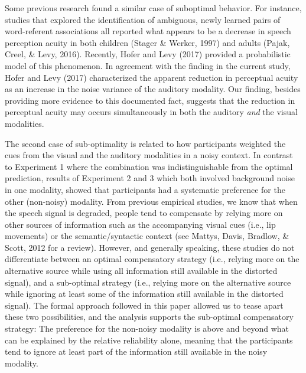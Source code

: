 \documentclass[english,floatsintext,man]{apa6}
\theoremstyle{definition}
\theoremstyle{definition}
\theoremstyle{definition}
\theoremstyle{remark}
\begin{document}
Some previous research found a similar case of suboptimal behavior. For
instance, studies that explored the identification of ambiguous, newly
learned pairs of word-referent associations all reported what appears to
be a decrease in speech perception acuity in both children (Stager \&
Werker, 1997) and adults (Pajak, Creel, \& Levy, 2016). Recently, Hofer
and Levy (2017) provided a probabilistic model of this phenomenon. In
agreement with the finding in the current study, Hofer and Levy (2017)
characterized the apparent reduction in perceptual acuity as an increase
in the noise variance of the auditory modality. Our finding, besides
providing more evidence to this documented fact, suggests that the
reduction in perceptual acuity may occurs simultaneously in both the
auditory \emph{and} the visual modalities.

The second case of sub-optimality is related to how participants
weighted the cues from the visual and the auditory modalities in a noisy
context. In contrast to Experiment 1 where the combination was
indistinguishable from the optimal prediction, results of Experiment 2
and 3 which both involved background noise in one modality, showed that
participants had a systematic preference for the other (non-noisy)
modality. From previous empirical studies, we know that when the speech
signal is degraded, people tend to compensate by relying more on other
sources of information such as the accompanying visual cues (i.e., lip
movements) or the semantic/syntactic context (see Mattys, Davis,
Bradlow, \& Scott, 2012 for a review). However, and generally speaking,
these studies do not differentiate between an optimal compensatory
strategy (i.e., relying more on the alternative source while using all
information still available in the distorted signal), and a sub-optimal
strategy (i.e., relying more on the alternative source while ignoring at
least some of the information still available in the distorted signal).
The formal approach followed in this paper allowed us to tease apart
these two possibilities, and the analysis supports the sub-optimal
compensatory strategy: The preference for the non-noisy modality is
above and beyond what can be explained by the relative reliability
alone, meaning that the participants tend to ignore at least part of the
information still available in the noisy modality.
\end{document}
